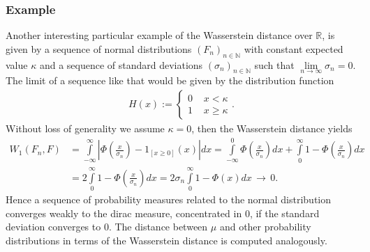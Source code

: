 \documentclass[11pt,a4paper]{article}
\begin{document}
\subsubsection{Example}
Another interesting particular example of the Wasserstein distance over $\mathbb{R}$, is given by a sequence of normal distributions $(F_n)_{n\in\mathbb{N}}$ with constant expected value $\kappa$ and a sequence of standard deviations $(\sigma_n)_{n\in\mathbb{N}}$ such that $\lim\limits_{n\rightarrow\infty}\sigma_n=0$. The limit of a sequence like that would be given by the distribution function
\begin{align*} 
H(x):=\begin{cases}0\,&\,x<\kappa\\1\,&\,x\geq\kappa\end{cases}.
\end{align*}
Without loss of generality we assume $\kappa=0$, then the Wasserstein distance yields
\begin{align*}
W_1(F_n,F)&=\int\limits_{-\infty}^{\infty}|\Phi(\frac{x}{\sigma_n})-1_{[x\geq{}0]}(x)|dx=\int\limits_{-\infty}^{0}\Phi(\frac{x}{\sigma_n})dx + \int\limits_{0}^{\infty}1-\Phi(\frac{x}{\sigma_n})dx \\&= 2\int\limits_{0}^{\infty}1-\Phi(\frac{x}{\sigma_n})dx = 2\sigma_n\int\limits_{0}^{\infty}1-\Phi(x)dx\,\longrightarrow\,0.
\end{align*} 
Hence a sequence of probability measures related to the normal distribution converges weakly to the dirac measure, concentrated in $0$, if the standard deviation converges to $0$.
The distance between $\mu$ and other probability distributions in terms of the Wasserstein distance is computed analogously. 
\end{document}
